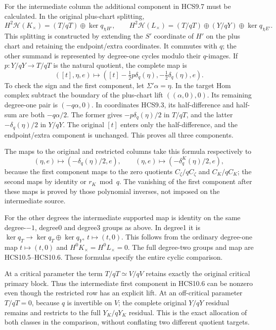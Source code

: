For the intermediate column the additional component in HCS9.7 must be
calculated. In the original plus-chart splitting, \[
H^2\mathscr H(K_\times)
=(T/qT)\oplus\ker q_{\chi H'},\qquad
H^2\mathscr H(L_\times)
=(T/qT)\oplus(Y/qY)\oplus\ker q_{\chi E'}.
\tag{HCS10.5}
\] This splitting is constructed by extending the \(S'\) coordinate of
\(H'\) on the plus chart and retaining the endpoint/extra coordinates.
It commutes with \(q\); the other summand is represented by degree-one
cycles modulo their \(q\)-images. If \(p:Y/qY\to T/qT\) is the natural
quotient, the complete map is \[
\boxed{
([t],\eta,e)\longmapsto
\left([t]-\tfrac12p\delta_q(\eta),
-\tfrac12\delta_q(\eta),e\right).}
\tag{HCS10.6}
\] To check the sign and the first component, let
\(\Sigma'\alpha=\eta\). In the target Hom complex subtract the boundary
of the plus-chart lift \(((\alpha,0),0)\). Its remaining degree-one pair
is \((-q\alpha,0)\). In coordinates HCS9.3, its half-difference and
half-sum are both \(-q\alpha/2\). The former gives
\(-p\delta_q(\eta)/2\) in \(T/qT\), and the latter \(-\delta_q(\eta)/2\)
in \(Y/qY\). The original \([t]\) enters only the half-difference, and
the endpoint/extra component is unchanged. This proves all three
components.

The maps to the original and restricted columns take this formula
respectively to \[
(\eta,e)\mapsto(-\delta_q(\eta)/2,e),\qquad
(\eta,e)\mapsto(-\delta_q^K(\eta)/2,e),
\] because the first component maps to the zero quotients
\(C_\zeta/qC_\zeta\) and \(C_K/qC_K\); the second maps by identity or
\(r_K\bmod q\). The vanishing of the first component after these maps is
proved by those polynomial inverses, not imposed on the intermediate
source.

For the other degrees the intermediate supported map is identity on the
same degree-\(-1\), degree0 and degree3 groups as above. In degree1 it
is \(\ker q_T\to\ker q_T\oplus\ker q_Y,\ t\mapsto(t,0)\). This follows
from the ordinary degree-one map \(t\mapsto(t,0)\) and
\(H^0K_\times=H^0L_\times=0\). The full degree-two groups and map are
HCS10.5--HCS10.6. These formulas specify the entire cyclic comparison.

At a critical parameter the term \(T/qT\simeq V/qV\) retains exactly the
original critical primary block. Thus the intermediate first component
in HCS10.6 can be nonzero even though the restricted row has an explicit
lift. At an off-critical parameter \(T/qT=0\), because \(q\) is
invertible on \(V\); the complete original \(Y/qY\) residual remains and
restricts to the full \(Y_K/qY_K\) residual. This is the exact
allocation of both classes in the comparison, without conflating two
different quotient targets.

